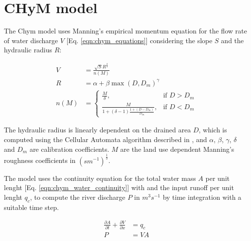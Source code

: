 \documentclass[journal abbreviation, manuscript]{copernicus}
\begin{document}




\appendix
\section{CHyM model}
\label{appendix:chym}

The Chym model uses Manning's empirical momentum equation \citep{manning-1891}
for the flow rate of water discharge $V$ [Eq. \ref{eqn:chym_equations}]
considering the slope $S$ and the hydraulic radius $R$:

\begin{align}
    \label{eqn:chym_equations}
    V &= \frac{\sqrt{S} R^{\frac{2}{3}}}{n(M)} \\
    R &= \alpha + \beta \max(D,D_{m})^{\gamma} \\
    n(M) &= \begin{cases}
      \frac{M}{\delta}, & \text{if } D > D_{m} \\
      \frac{M}{1+(\delta-1) \frac{1+(D-D_{m})}{D_{m}}}, & \text{if } D < D_{m}
    \end{cases}
\end{align}

The hydraulic radius is linearly dependent on the drained area $D$, which
is computed using the Cellular Automata algorithm described in
\cite{coppola-2007}, and $\alpha$, $\beta$, $\gamma$, $\delta$ and $D_{m}$ are
calibration coefficients.
$M$ are the land use dependent Manning's roughness coefficients in
$(s m^{-1})^{\frac{1}{3}}$.

The model uses the continuity equation for the total water mass $A$ per unit
lenght [Eq. \ref{eqn:chym_water_continuity}] with and the input runoff per unit
lenght $q_c$, to compute the river discharge $P$ in $m^3 s^{-1}$ by time
integration with a suitable time step.

\begin{align}
    \label{eqn:chym_water_continuity}
    \frac{\partial A}{\partial t} + \frac{\partial V}{\partial x} &= q_c \\
    P &= V A
\end{align}

\noappendix       %

\end{document}
